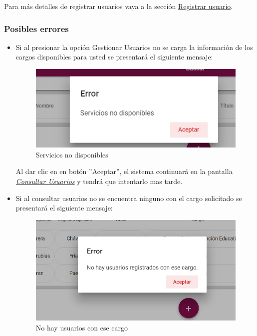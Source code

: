   Para más detalles de registrar usuarios vaya a la sección \hyperlink{registrar}{Registrar usuario}.
  
  \subsubsection{Posibles errores}
  \begin{itemize}
  	\item Si al  presionar la opción Gestionar Usuarios no se carga la información de los cargos disponibles para usted se presentará el siguiente mensaje:
  	
  	\begin{figure}[!hbtp]
  		\centering
  		\includegraphics[width=0.4\linewidth]{images/SP5/MSGSN}
  		\caption{Servicios no disponibles}
  		\label{SND}
  		
  	\end{figure}
  	
  	Al dar clic en en botón ''Aceptar'', el sistema continuará en la pantalla  \hyperlink{consultarUs}{\textit{Consultar Usuarios}} y tendrá que intentarlo  mas tarde.
  	
  	\item Si al consultar usuarios no se encuentra ninguno con el cargo solicitado se presentará el siguiente mensaje:
  	\begin{figure}[!hbtp]
  		\centering
  		\includegraphics[width=0.4\linewidth]{images/SP5/MSG21}
  		\caption{No hay usuarios con ese cargo}
  		\label{mensaje21}
  	\end{figure}
  	
  \end{itemize}
  
  
  
